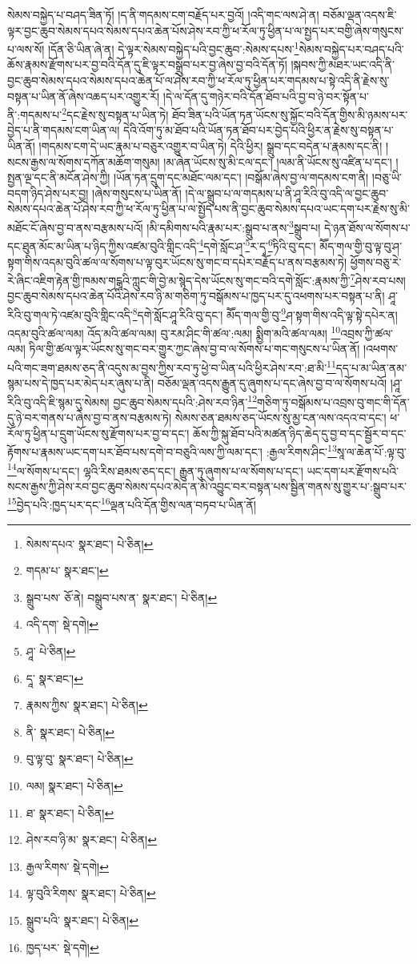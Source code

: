 སེམས་བསྐྱེད་པ་བཤད་ཟིན་ཏོ། །ད་ནི་གདམས་ངག་བརྗོད་པར་བྱའོ། །འདི་གང་ལས་ཤེ་ན། བཅོམ་ལྡན་འདས་ཇི་ལྟར་བྱང་ཆུབ་སེམས་དཔའ་སེམས་དཔའ་ཆེན་པོས་ཤེས་རབ་ཀྱི་ཕ་རོལ་ཏུ་ཕྱིན་པ་ལ་སྤྱད་པར་བགྱི་ཞེས་གསུངས་པ་ལས་སོ། །དོན་ཅི་ཡིན་ཞེ་ན། དེ་ལྟར་སེམས་བསྐྱེད་པའི་བྱང་ཆུབ་:སེམས་དཔས་\footnote{སེམས་དཔའ་  སྣར་ཐང་།  པེ་ཅིན། }སེམས་བསྐྱེད་པར་བཤད་པའི་ཆོས་རྣམས་རྫོགས་པར་བྱ་བའི་དོན་དུ་ཇི་ལྟར་བསྒྲུབ་པར་བྱ་ཞེས་བྱ་བའི་དོན་ཏོ། །སྐབས་ཀྱི་མཐར་ཡང་འདི་ནི་བྱང་ཆུབ་སེམས་དཔའ་སེམས་དཔའ་ཆེན་པོ་ལ་ཤེས་རབ་ཀྱི་ཕ་རོལ་ཏུ་ཕྱིན་པར་གདམས་པ་སྟེ་འདི་ནི་རྗེས་སུ་བསྟན་པ་ཡིན་ནོ་ཞེས་འཆད་པར་འགྱུར་རོ། །དེ་ལ་དོན་དུ་གཉེར་བའི་དོན་ཐོབ་པའི་བྱ་བ་ཉེ་བར་སྟོན་པ་ནི་:གདམས་པ་\footnote{གདམ་པ་  སྣར་ཐང་། }དང་རྗེས་སུ་བསྟན་པ་ཡིན་ཏེ། ཐོབ་ཟིན་པའི་ཡོན་ཏན་ཡོངས་སུ་སྐྱོང་བའི་དོན་གྱིས་མི་ཉམས་པར་བྱེད་པ་ནི་གདམས་ངག་ཡིན་ལ། དེའི་འོག་ཏུ་མ་ཐོབ་པའི་ཡོན་ཏན་ཐོབ་པར་བྱེད་པའི་ཕྱིར་ན་རྗེས་སུ་བསྟན་པ་ཡིན་ནོ། །གདམས་ངག་དེ་ཡང་རྣམ་པ་བཅུར་འགྱུར་བ་ཡིན་ཏེ། དེའི་ཕྱིར། སྒྲུབ་དང་བདེན་པ་རྣམས་དང་ནི། །སངས་རྒྱས་ལ་སོགས་དཀོན་མཆོག་གསུམ། །མ་ཞེན་ཡོངས་སུ་མི་ངལ་དང་། །ལམ་ནི་ཡོངས་སུ་འཛིན་པ་དང་། །སྤྱན་ལྔ་དང་ནི་མངོན་ཤེས་ཀྱི། །ཡོན་ཏན་དྲུག་དང་མཐོང་ལམ་དང་། །བསྒོམ་ཞེས་བྱ་ལ་གདམས་ངག་ནི། །བཅུ་ཡི་བདག་ཉིད་ཤེས་པར་བྱ། །ཞེས་གསུངས་པ་ཡིན་ནོ། །དེ་ལ་སྒྲུབ་པ་ལ་གདམས་པ་ནི་ཤཱ་རིའི་བུ་འདི་ལ་བྱང་ཆུབ་སེམས་དཔའ་ཆེན་པོ་ཤེས་རབ་ཀྱི་ཕ་རོལ་ཏུ་ཕྱིན་པ་ལ་སྤྱོད་པས་ནི་བྱང་ཆུབ་སེམས་དཔའ་ཡང་དག་པར་རྗེས་སུ་མི་མཐོང་ངོ་ཞེས་བྱ་བ་ནས་བརྩམས་པའོ། །མི་དམིགས་པའི་རྣམ་པར་:སྒྲུབ་པ་ནས་\footnote{སྒྲུབ་པས་  ཅོ་ནེ། བསྒྲུབ་པས་ན་  སྣར་ཐང་།  པེ་ཅིན། }སྒྲུབ་པ། དེ་ཉན་ཐོས་ལ་སོགས་པ་དང་ཐུན་མོང་མ་ཡིན་པ་ཉིད་ཀྱིས་འཛམ་བུའི་གླིང་འདི་\footnote{འདི་དག་  སྡེ་དགེ། }དགེ་སློང་ཤ་\footnote{ཤཱ་  པེ་ཅིན། }ར་དྭ་\footnote{དཱ་  སྣར་ཐང་། }ཏིའི་བུ་དང་། མཽད་གལ་གྱི་བུ་ལྟ་བུ་ཤ་སྟག་གིས་འདམ་བུའི་ཚལ་ལ་སོགས་པ་ལྟ་བུར་ཡོངས་སུ་གང་བ་དཔེར་བརྗོད་པ་ནས་བརྩམས་ཏེ། ཕྱོགས་བཅུ་རེ་རེ་ཞིང་འཇིག་རྟེན་གྱི་ཁམས་གངྒཱའི་ཀླུང་གི་བྱེ་མ་སྙེད་དེས་ཡོངས་སུ་གང་བའི་དགེ་སློང་:རྣམས་ཀྱི་\footnote{རྣམས་ཀྱིས་  སྣར་ཐང་།  པེ་ཅིན། }ཤེས་རབ་པས། བྱང་ཆུབ་སེམས་དཔའ་ཆེན་པོའི་ཤེས་རབ་ཉི་མ་གཅིག་ཏུ་བསྒོམས་པ་ཁྱད་པར་དུ་འཕགས་པར་བསྟན་པ་ནི། ཤཱ་རིའི་བུ་གལ་ཏེ་འཛམ་བུའི་གླིང་འདི་\footnote{ནི་  སྣར་ཐང་།  པེ་ཅིན། }དགེ་སློང་ཤཱ་རིའི་བུ་དང་། མཽད་གལ་གྱི་བུ་\footnote{བུ་ལྟ་བུ་  སྣར་ཐང་།  པེ་ཅིན། }ཤ་སྟག་གིས་འདི་ལྟ་སྟེ་དཔེར་ན། འདམ་བུའི་ཚལ་ལམ། འོད་མའི་ཚལ་ལམ། བུ་རམ་ཤིང་གི་ཚལ་:ལམ། སྨྱིག་མའི་ཚལ་ལམ། \footnote{ལམ།    སྣར་ཐང་།  པེ་ཅིན། }འབྲས་ཀྱི་ཚལ་ལམ། ཏིལ་གྱི་ཚལ་ལྟར་ཡོངས་སུ་གང་བར་གྱུར་ཀྱང་ཞེས་བྱ་བ་ལ་སོགས་པ་གང་གསུངས་པ་ཡིན་ནོ། །འཕགས་པའི་གང་ཟག་ཐམས་ཅད་ནི་འདུས་མ་བྱས་ཀྱིས་རབ་ཏུ་ཕྱེ་བ་ཡིན་པའི་ཕྱིར་ཤེས་རབ་:ཐ་མི་\footnote{ཐ་  སྣར་ཐང་།  པེ་ཅིན། }དད་པ་མ་ཡིན་ནམ་སྙམ་པས་དེ་ཁྱད་པར་མེད་པར་ཞུས་པ་ནི། བཅོམ་ལྡན་འདས་རྒྱུན་དུ་ཞུགས་པ་དང་ཞེས་བྱ་བ་ལ་སོགས་པའོ། །ཤཱ་རིའི་བུ་འདི་ཇི་སྙམ་དུ་སེམས། བྱང་ཆུབ་སེམས་དཔའི་:ཤེས་རབ་ཉིན་\footnote{ཤེས་རབ་ཉི་མ་  སྣར་ཐང་།  པེ་ཅིན། }གཅིག་ཏུ་བསྒོམས་པ་འབྲས་བུ་གང་གི་དོན་དུ་ཉེ་བར་གནས་པ་ཞེས་བྱ་བ་ནས་བརྩམས་ཏེ། སེམས་ཅན་ཐམས་ཅད་ཡོངས་སུ་མྱ་ངན་ལས་འདའ་བ་དང་། ཕ་རོལ་ཏུ་ཕྱིན་པ་དྲུག་ཡོངས་སུ་རྫོགས་པར་བྱ་བ་དང་། ཆོས་ཀྱི་སྐུ་ཐོབ་པའི་མཚན་ཉིད་ཆེད་དུ་བྱ་བ་དང་སྦྱོར་བ་དང་རྟོགས་པ་རྣམས་ཡང་དག་པར་ཐོབ་པས་དགེ་བ་བཅུའི་ལས་ཀྱི་ལམ་དང་། :རྒྱལ་རིགས་ཤིང་\footnote{རྒྱལ་རིགས་  སྡེ་དགེ། }སཱ་ལ་ཆེན་པོ་:ལྟ་བུ་\footnote{ལྟ་བུའི་རིགས་  སྣར་ཐང་།  པེ་ཅིན། }ལ་སོགས་པ་དང་། ལྷའི་རིས་ཐམས་ཅད་དང་། རྒྱུན་ཏུ་ཞུགས་པ་ལ་སོགས་པ་དང་། ཡང་དག་པར་རྫོགས་པའི་སངས་རྒྱས་ཀྱི་ཤེས་རབ་བྱང་ཆུབ་སེམས་དཔའ་མེད་ན་མི་འབྱུང་བར་བསྟན་པས་སྦྱིན་གནས་སུ་གྱུར་པ་:སྒྲུབ་པར་\footnote{སྒྲུབ་པའི་  སྣར་ཐང་།  པེ་ཅིན། }བྱེད་པའི་:ཁྱད་པར་དང་\footnote{ཁྱད་པར་  སྡེ་དགེ། }ལྡན་པའི་དོན་གྱིས་ལན་བཏབ་པ་ཡིན་ནོ། 